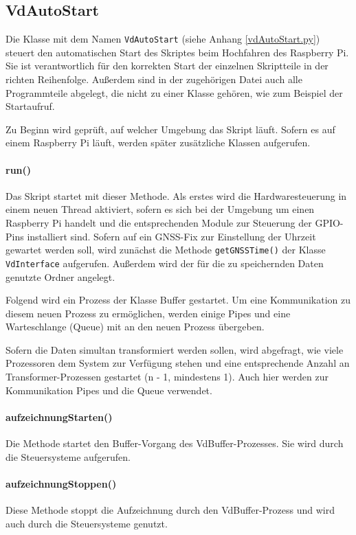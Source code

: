 \documentclass[a4paper,12pt,bibliography=totoc, listof=totoc,titlepage]{scrreprt}
\newcommand{\code}[1]{\texttt{#1}}
\begin{document}
\subsection{VdAutoStart}
Die Klasse mit dem Namen \code{VdAutoStart} (siehe Anhang \ref{vdAutoStart.py}) steuert den automatischen Start des Skriptes beim Hochfahren des Raspberry Pi. Sie ist verantwortlich für den korrekten Start der einzelnen Skriptteile in der richten Reihenfolge. Außerdem sind in der zugehörigen Datei auch alle Programmteile abgelegt, die nicht zu einer Klasse gehören, wie zum Beispiel der Startaufruf.

Zu Beginn wird geprüft, auf welcher Umgebung das Skript läuft. Sofern es auf einem Raspberry Pi läuft, werden später zusätzliche Klassen aufgerufen.

\paragraph{run()}
Das Skript startet mit dieser Methode. Als erstes wird die Hardwaresteuerung in einem neuen Thread aktiviert, sofern es sich bei der Umgebung um einen Raspberry Pi handelt und die entsprechenden Module zur Steuerung der GPIO-Pins installiert sind. Sofern auf ein GNSS-Fix zur Einstellung der Uhrzeit gewartet werden soll, wird zunächst die Methode \code{getGNSSTime()} der Klasse \code{VdInterface} aufgerufen. Außerdem wird der für die zu speichernden Daten genutzte Ordner angelegt.

Folgend wird ein Prozess der Klasse Buffer gestartet. Um eine Kommunikation zu diesem neuen Prozess zu ermöglichen, werden einige Pipes und eine Warteschlange (Queue) mit an den neuen Prozess übergeben.

Sofern die Daten simultan transformiert werden sollen, wird abgefragt, wie viele Prozessoren dem System zur Verfügung stehen und eine entsprechende Anzahl an Transformer-Prozessen gestartet (n - 1, mindestens 1). Auch hier werden zur Kommunikation Pipes und die Queue verwendet.

\paragraph{aufzeichnungStarten()}
Die Methode startet den Buffer-Vorgang des VdBuffer-Prozesses. Sie wird durch die Steuersysteme aufgerufen.

\paragraph{aufzeichnungStoppen()}
Diese Methode stoppt die Aufzeichnung durch den VdBuffer-Prozess und wird auch durch die Steuersysteme genutzt.
\end{document}
